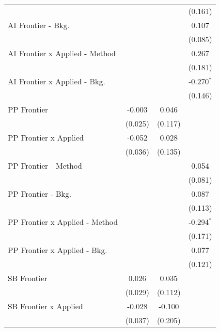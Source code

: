 \begin{tabular}{lccc}
                                  &               &         & (0.161)\\   
   AI Frontier - Bkg.             &               &         & 0.107\\   
                                  &               &         & (0.085)\\   
   AI Frontier x Applied - Method &               &         & 0.267\\   
                                  &               &         & (0.181)\\   
   AI Frontier x Applied - Bkg.   &               &         & -0.270$^{*}$\\   
                                  &               &         & (0.146)\\   
   PP Frontier                    & -0.003        & 0.046   &   \\   
                                  & (0.025)       & (0.117) &   \\   
   PP Frontier x Applied          & -0.052        & 0.028   &   \\   
                                  & (0.036)       & (0.135) &   \\   
   PP Frontier - Method           &               &         & 0.054\\   
                                  &               &         & (0.081)\\   
   PP Frontier - Bkg.             &               &         & 0.087\\   
                                  &               &         & (0.113)\\   
   PP Frontier x Applied - Method &               &         & -0.294$^{*}$\\   
                                  &               &         & (0.171)\\   
   PP Frontier x Applied - Bkg.   &               &         & 0.077\\   
                                  &               &         & (0.121)\\   
   SB Frontier                    & 0.026         & 0.035   &   \\   
                                  & (0.029)       & (0.112) &   \\   
   SB Frontier x Applied          & -0.028        & -0.100  &   \\   
                                  & (0.037)       & (0.205) &   \\   

\end{tabular}
